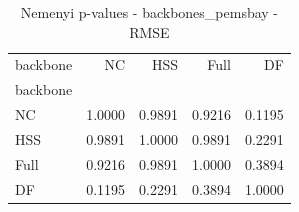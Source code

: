 \begin{table}
\caption{Nemenyi p-values - backbones_pemsbay - RMSE}
\label{tab:nemenyi_backbones_pemsbay_rmse}
\begin{tabular}{lrrrr}
\toprule
backbone & NC & HSS & Full & DF \\
backbone &  &  &  &  \\
\midrule
NC & 1.0000 & 0.9891 & 0.9216 & 0.1195 \\
HSS & 0.9891 & 1.0000 & 0.9891 & 0.2291 \\
Full & 0.9216 & 0.9891 & 1.0000 & 0.3894 \\
DF & 0.1195 & 0.2291 & 0.3894 & 1.0000 \\
\bottomrule
\end{tabular}
\end{table}
